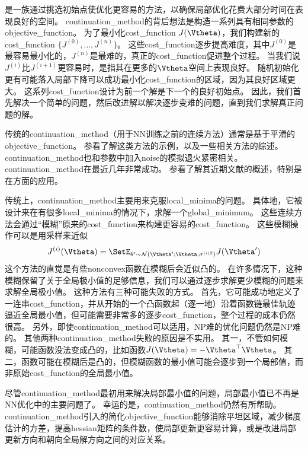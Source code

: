 是一族通过挑选初始点使优化更容易的方法，以确保局部优化花费大部分时间在表现良好的空间。
\gls{continuation_method}的背后想法是构造一系列具有相同参数的\gls{objective_function}。
为了最小化\gls{cost_function} $J(\Vtheta)$，我们构建新的\gls{cost_function} $\{J^{(0)},\dots,J^{(n)}\}$。
这些\gls{cost_function}逐步提高难度，其中$J^{(0)}$是最容易最小化的，$J^{(n)}$是最难的，真正的\gls{cost_function}促进整个过程。
当我们说$J^{(i)}$比$J^{(i+1)}$更容易时，是指其在更多的$\Vtheta$空间上表现良好。
随机初始化更有可能落入局部下降可以成功最小化\gls{cost_function}的区域，因为其良好区域更大。
这系列\gls{cost_function}设计为前一个解是下一个的良好初始点。
因此，我们首先解决一个简单的问题，然后改进解以解决逐步变难的问题，直到我们求解真正问题的解。

传统的\gls{continuation_method}（用于\gls{NN}训练之前的连续方法）通常是基于平滑的\gls{objective_function}。
参看\cite{Wu-97}了解这类方法的示例，以及一些相关方法的综述。
\gls{continuation_method}也和参数中加入\gls{noise}的模拟退火紧密相关\citep{Kirkpatrick83}。
\gls{continuation_method}在最近几年非常成功。
参看\cite{Mobahi+Fisher-AAAI2015}了解其近期文献的概述，特别是在方面的应用。


传统上，\gls{continuation_method}主要用来克服\gls{local_minima}的问题。
具体地，它被设计来在有很多\gls{local_minima}的情况下，求解一个\gls{global_minimum}。
这些连续方法会通过``模糊''原来的\gls{cost_function}来构建更容易的\gls{cost_function}。
这些模糊操作可以是用采样来近似
\begin{equation}
    J^{(i)}(\Vtheta) = \SetE_{\theta' \sim \mathcal{N}(\Vtheta'; \Vtheta, \sigma^{(i)2})} J(\Vtheta')
\end{equation}
这个方法的直觉是有些\gls{nonconvex}函数在模糊后会近似凸的。
在许多情况下，这种模糊保留了关于全局极小值的足够信息，我们可以通过逐步求解更少模糊的问题来求解全局极小值。
这种方法有三种可能失败的方式。
首先，它可能成功地定义了一连串\gls{cost_function}，并从开始的一个凸函数起（逐一地）沿着函数链最佳轨迹逼近全局最小值，但可能需要非常多的逐步\gls{cost_function}，整个过程的成本仍然很高。
另外，即使\gls{continuation_method}可以适用，NP难的优化问题仍然是NP难的。
其他两种\gls{continuation_method}失败的原因是不实用。
其一，不管如何模糊，可能函数没法变成凸的，比如函数$J(\Vtheta) = -\Vtheta^\top \Vtheta$。
其二，函数可能在模糊后是凸的，但模糊函数的最小值可能会逐步到一个局部值，而非原始\gls{cost_function}的全局最小值。


尽管\gls{continuation_method}最初用来解决局部最小值的问题，局部最小值已不再是\gls{NN}优化中的主要问题了。
幸运的是，\gls{continuation_method}仍然有所帮助。
\gls{continuation_method}引入的简化\gls{objective_function}能够消除平坦区域，减少梯度估计的方差，提高\gls{hessian}矩阵的条件数，使局部更新更容易计算，或是改进局部更新方向和朝向全局解方向之间的对应关系。

